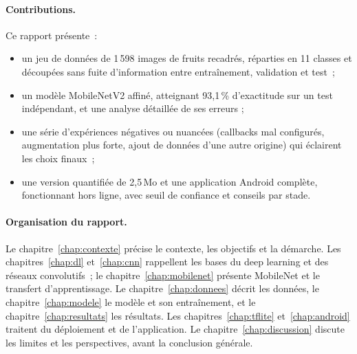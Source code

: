 \paragraph{Contributions.} Ce rapport présente~:
\begin{itemize}
  \item un jeu de données de 1\,598 images de fruits recadrés, réparties en 11 classes et découpées sans fuite d’information entre entraînement, validation et test~;
  \item un modèle MobileNetV2 affiné, atteignant 93,1\,\% d’exactitude sur un test indépendant, et une analyse détaillée de ses erreurs ;
  \item une série d’expériences négatives ou nuancées (callbacks mal configurés, augmentation plus forte, ajout de données d’une autre origine) qui éclairent les choix finaux~;
  \item une version quantifiée de 2,5\,Mo et une application Android complète, fonctionnant hors ligne, avec seuil de confiance et conseils par stade.
\end{itemize}

\paragraph{Organisation du rapport.} Le chapitre~\ref{chap:contexte} précise le contexte, les objectifs et la démarche. Les chapitres~\ref{chap:dl} et~\ref{chap:cnn} rappellent les bases du deep learning et des réseaux convolutifs~; le chapitre~\ref{chap:mobilenet} présente MobileNet et le transfert d’apprentissage. Le chapitre~\ref{chap:donnees} décrit les données, le chapitre~\ref{chap:modele} le modèle et son entraînement, et le chapitre~\ref{chap:resultats} les résultats. Les chapitres~\ref{chap:tflite} et~\ref{chap:android} traitent du déploiement et de l’application. Le chapitre~\ref{chap:discussion} discute les limites et les perspectives, avant la conclusion générale.
\clearpage
